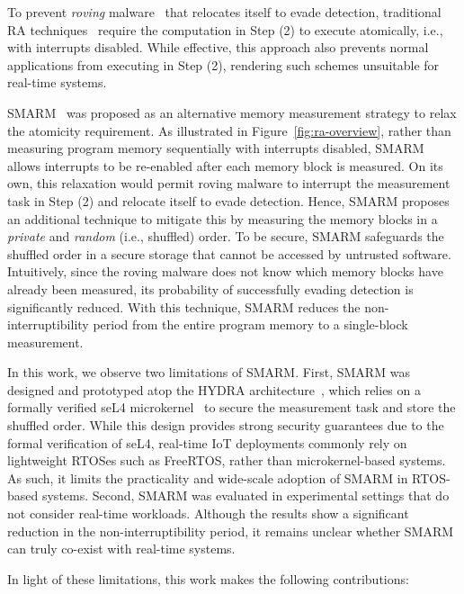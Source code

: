 \documentclass[journal]{IEEEtran}
\begin{document}
To prevent \emph{roving} malware~\cite{smarm} that relocates itself to evade detection, traditional RA techniques~\cite{smart,hydra,vrased} require the computation in Step (2) to execute atomically, i.e., with interrupts disabled.
While effective, this approach also prevents normal applications from executing in Step (2), rendering such schemes unsuitable for real-time systems.

SMARM~\cite{smarm} was proposed as an alternative memory measurement strategy to relax the atomicity requirement.
As illustrated in Figure~\ref{fig:ra-overview}, rather than measuring program memory sequentially with interrupts disabled, SMARM allows interrupts to be re-enabled after each memory block is measured.
On its own, this relaxation would permit roving malware to interrupt the measurement task in Step (2) and relocate itself to evade detection.
Hence, SMARM proposes an additional technique to mitigate this by measuring the memory blocks in a \emph{private} and \emph{random} (i.e., shuffled) order.
To be secure, SMARM safeguards the shuffled order in a secure storage that cannot be accessed by untrusted software.
Intuitively, since the roving malware does not know which memory blocks have already been measured, its probability of successfully evading detection is significantly reduced.
With this technique, SMARM reduces the non-interruptibility period from the entire program memory to a single-block measurement.

In this work, we observe two limitations of SMARM.
First, SMARM was designed and prototyped atop the HYDRA architecture~\cite{hydra}, which relies on a formally verified seL4 microkernel~\cite{sel4} to secure the measurement task and store the shuffled order.
While this design provides strong security guarantees due to the formal verification of seL4, real-time IoT deployments commonly rely on lightweight RTOSes such as FreeRTOS, rather than microkernel-based systems.
As such, it limits the practicality and wide-scale adoption of SMARM in RTOS-based systems.
Second, SMARM was evaluated in experimental settings that do not consider real-time workloads.
Although the results show a significant reduction in the non-interruptibility period, it remains unclear whether SMARM can truly co-exist with real-time systems.

In light of these limitations, this work makes the following contributions:
\end{document}
